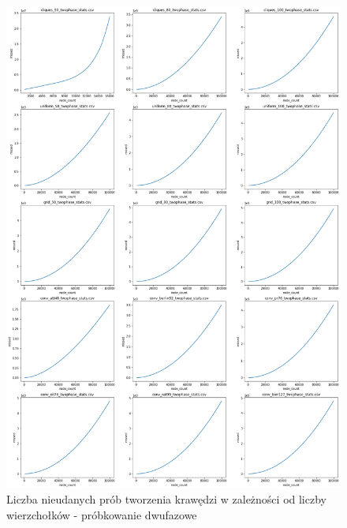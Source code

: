 \begin{figure}[h!]
    \centering
    \includegraphics[width=\textwidth]{chapters/experiments/img/merged_plots/main_twophase/missed.png}
    \caption{Liczba nieudanych prób tworzenia krawędzi w zależności od liczby wierzchołków - próbkowanie dwufazowe}
    \label{fig:main_twophase_missed}
\end{figure}

